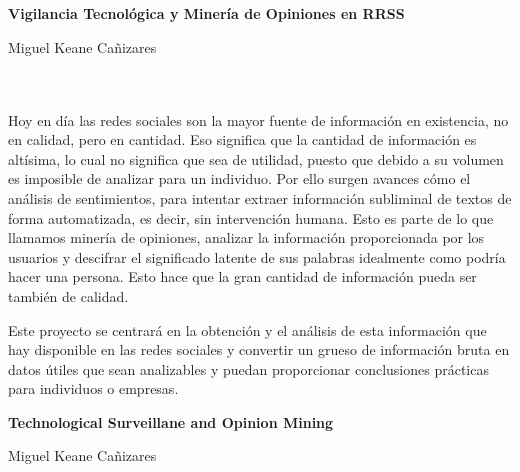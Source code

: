 \chapter*{}


%



\cleardoublepage
\thispagestyle{empty}

\begin{center}
{\large\bfseries Vigilancia Tecnológica y Minería de Opiniones en RRSS}\\
\end{center}
\begin{center}
Miguel Keane Cañizares \\
\end{center}

\\

\vspace{0.7cm}
\\

Hoy en día las redes sociales son la mayor fuente de información en existencia, no en calidad, pero en cantidad. Eso significa que la cantidad de información es altísima, lo cual no significa que sea de utilidad, puesto que debido a su volumen es imposible de analizar para un individuo. Por ello surgen avances cómo el análisis de sentimientos, para intentar extraer información subliminal de textos de forma automatizada, es decir, sin intervención humana. Esto es parte de lo que llamamos minería de opiniones, analizar la información proporcionada por los usuarios y descifrar el significado latente de sus palabras idealmente como podría hacer una persona. Esto hace que la gran cantidad de información pueda ser también de calidad. 

Este proyecto se centrará en la obtención y el análisis de esta información que hay disponible en las redes sociales y convertir un grueso de información bruta en datos útiles que sean analizables y puedan proporcionar conclusiones prácticas para individuos o empresas. 
\cleardoublepage


\thispagestyle{empty}


\begin{center}
{\large\bfseries Technological Surveillane and Opinion Mining}\\
\end{center}
\begin{center}
Miguel Keane Cañizares\\
\end{center}

